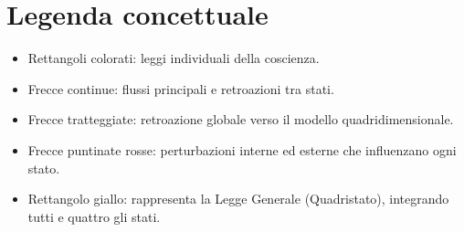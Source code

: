 \documentclass[12pt,a4paper]{article}
\begin{document}
\section*{Legenda concettuale}
\begin{itemize}
    \item Rettangoli colorati: leggi individuali della coscienza.
    \item Frecce continue: flussi principali e retroazioni tra stati.
    \item Frecce tratteggiate: retroazione globale verso il modello quadridimensionale.
    \item Frecce puntinate rosse: perturbazioni interne ed esterne che influenzano ogni stato.
    \item Rettangolo giallo: rappresenta la Legge Generale (Quadristato), integrando tutti e quattro gli stati.
\end{itemize}
\end{document}
